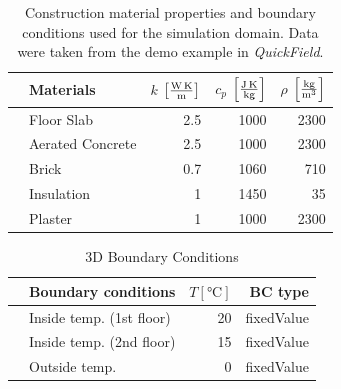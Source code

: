 \begin{table}[htb]
    \centering
    \label{tab:construction_material_properties}
    \caption[3D Material Properties]{Construction material properties and boundary conditions used for the simulation domain. Data were taken from the demo example in \textit{QuickField}.}
      \centering
        \begin{tabular}{clrrr}    
            \toprule   
            & Materials       & $k$ $\left[ \si[per-mode=fraction]{\watt\per\metre\kelvin} \right]$ & $c_p$   $\left[ \si[per-mode=fraction]{\joule\per\kilogram\kelvin}\right]$ & $\rho$  $\left[ \si[per-mode=fraction]{\kilogram\per\cubic\metre} \right]$   \\
            \midrule
            & Floor Slab        & 2.5                        & 1000                      & 2300               \\
            & Aerated Concrete  & 2.5                        & 1000                      & 2300               \\
            & Brick             & 0.7                        & 1060                       & 710               \\
            & Insulation        & 1                         & 1450                      & 35               \\
            & Plaster           & 1                         & 1000                      & 2300              \\
            \bottomrule
        \end{tabular}
  
\end{table}


    \begin{table}[htb]
   
      \caption{3D Boundary Conditions}
      \centering
        \begin{tabular}{llrr}    
            \toprule   
            & Boundary conditions          & $T [\si{\degreeCelsius}]$           & BC type                   \\ 
            \midrule
            & Inside temp.  (1st floor)         & 20                          & fixedValue                \\
            & Inside temp.  (2nd floor)          & 15                          & fixedValue                \\
            & Outside temp.  & 0                          & fixedValue                \\ 
            \bottomrule
        \end{tabular}

\end{table}






